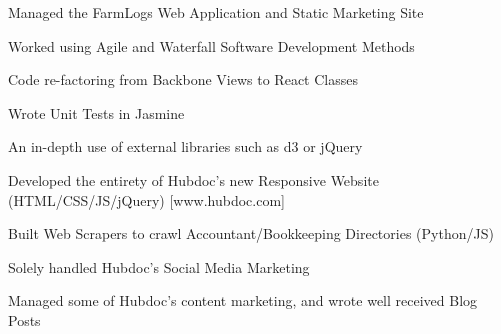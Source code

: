 \documentclass[letterpaper]{deedy-resume} %
\begin{document}

\newpage %

\begin{minipage}[t]{0.33\textwidth} %

\end{minipage} %
\hfill
\begin{minipage}[t]{0.66\textwidth} %


  \begin{tightitemize}
  \item Managed the FarmLogs Web Application and Static Marketing Site
  \item Worked using Agile and Waterfall Software Development Methods
  \item Code re-factoring from Backbone Views to React Classes
  \item Wrote Unit Tests in Jasmine
  \item An in-depth use of external libraries such as d3 or jQuery
  \end{tightitemize}

  \sectionspace %


  \begin{tightitemize}
  \item Developed the entirety of Hubdoc's new Responsive Website (HTML/CSS/JS/jQuery) [www.hubdoc.com]
  \item Built Web Scrapers to crawl Accountant/Bookkeeping Directories (Python/JS)
  \item Solely handled Hubdoc's Social Media Marketing
  \item Managed some of Hubdoc's content marketing, and wrote well received Blog Posts
  \end{tightitemize}

  \sectionspace %



\end{minipage}
\end{document}
